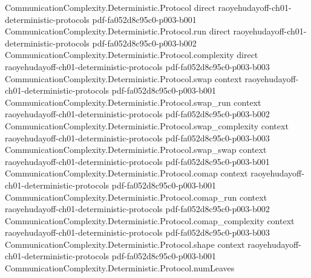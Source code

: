 \begin{lemma}
\label{CommunicationComplexity.Deterministic.Protocol.balanced_aux}
\leanok
{}
\proofstep
  {CommunicationComplexity.Deterministic.Protocol}
  {direct}
  {raoyehudayoff-ch01-deterministic-protocols}
  {pdf-fa052d8c95c0-p003-b001}
\proofstep
  {CommunicationComplexity.Deterministic.Protocol.run}
  {direct}
  {raoyehudayoff-ch01-deterministic-protocols}
  {pdf-fa052d8c95c0-p003-b002}
\proofstep
  {CommunicationComplexity.Deterministic.Protocol.complexity}
  {direct}
  {raoyehudayoff-ch01-deterministic-protocols}
  {pdf-fa052d8c95c0-p003-b003}
\proofstep
  {CommunicationComplexity.Deterministic.Protocol.swap}
  {context}
  {raoyehudayoff-ch01-deterministic-protocols}
  {pdf-fa052d8c95c0-p003-b001}
\proofstep
  {CommunicationComplexity.Deterministic.Protocol.swap_run}
  {context}
  {raoyehudayoff-ch01-deterministic-protocols}
  {pdf-fa052d8c95c0-p003-b002}
\proofstep
  {CommunicationComplexity.Deterministic.Protocol.swap_complexity}
  {context}
  {raoyehudayoff-ch01-deterministic-protocols}
  {pdf-fa052d8c95c0-p003-b003}
\proofstep
  {CommunicationComplexity.Deterministic.Protocol.swap_swap}
  {context}
  {raoyehudayoff-ch01-deterministic-protocols}
  {pdf-fa052d8c95c0-p003-b001}
\proofstep
  {CommunicationComplexity.Deterministic.Protocol.comap}
  {context}
  {raoyehudayoff-ch01-deterministic-protocols}
  {pdf-fa052d8c95c0-p003-b001}
\proofstep
  {CommunicationComplexity.Deterministic.Protocol.comap_run}
  {context}
  {raoyehudayoff-ch01-deterministic-protocols}
  {pdf-fa052d8c95c0-p003-b002}
\proofstep
  {CommunicationComplexity.Deterministic.Protocol.comap_complexity}
  {context}
  {raoyehudayoff-ch01-deterministic-protocols}
  {pdf-fa052d8c95c0-p003-b003}
\proofstep
  {CommunicationComplexity.Deterministic.Protocol.shape}
  {context}
  {raoyehudayoff-ch01-deterministic-protocols}
  {pdf-fa052d8c95c0-p003-b001}
\proofstep
  {CommunicationComplexity.Deterministic.Protocol.numLeaves}

\end{lemma}
